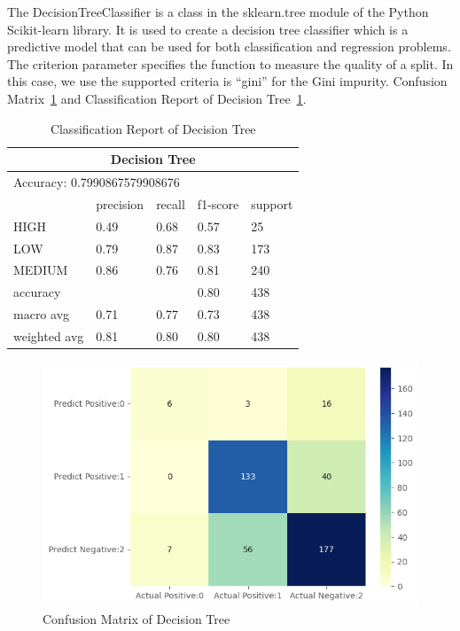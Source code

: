 The DecisionTreeClassifier is a class in the sklearn.tree module of the Python Scikit-learn library. It is used to create a decision tree classifier which is a predictive model that can be used for both classification and regression problems. The criterion parameter specifies the function to measure the quality of a split. In this case, we use the supported criteria is “gini” for the Gini impurity.
Confusion Matrix~\ref{cmdt} and Classification Report of Decision Tree~\ref{tabledt}.
\begin{table}[H]\centering
    \begin{tabular}{@{}lllll@{}}
    \toprule
    \multicolumn{5}{c}{Decision Tree}                 \\ \midrule
    \multicolumn{5}{l}{Accuracy: 0.7990867579908676}       \\\midrule
                 & precision & recall & f1-score & support \\
    HIGH         & 0.49      & 0.68   & 0.57     & 25      \\ 
    LOW          & 0.79      & 0.87   & 0.83     & 173     \\
    MEDIUM       & 0.86      & 0.76   & 0.81     & 240     \\
    accuracy     &           &        & 0.80     & 438     \\
    macro avg    & 0.71      & 0.77   & 0.73     & 438     \\
    weighted avg & 0.81      & 0.80   & 0.80     & 438     \\ \bottomrule
    \end{tabular}
    \caption{Classification Report of Decision Tree}
    \label{tabledt}
    \end{table}

    \begin{figure}[H]
        \includegraphics[scale=0.7]{imgs/nb_cm}
        \centering
        \caption{Confusion Matrix of Decision Tree}
        \label{cmdt}
    \end{figure}
